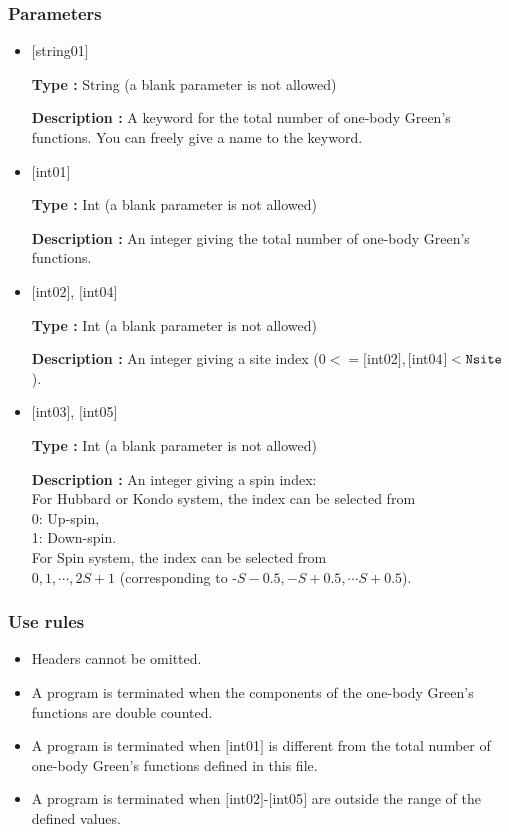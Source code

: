 \subsubsection{Parameters}
 \begin{itemize}

    \item  $[$string01$]$
   
    {\bf Type :} String (a blank parameter is not allowed)

   {\bf Description :} A keyword for the total number of one-body Green's functions. You can freely give a name to the keyword.

   \item  $[$int01$]$
   
    {\bf Type :} Int (a blank parameter is not allowed)

   {\bf Description :}  An integer giving the total number of one-body Green's functions.

  \item  $[$int02$]$, $[$int04$]$

 {\bf Type :} Int (a blank parameter is not allowed)

{\bf Description :} An integer giving a site index ($0<= [$int02$], [$int04$]<\verb|Nsite|$).
 
  \item  $[$int03$]$, $[$int05$]$

 {\bf Type :} Int (a blank parameter is not allowed)

{\bf Description :} 
An integer giving a spin index:\\
For Hubbard or Kondo system, the index can be selected from\\
0: Up-spin,\\
1: Down-spin.\\
For Spin system, the index can be selected from\\
$0, 1, \cdots, 2S+1$ (corresponding to -$S-0.5, -S+0.5, \cdots S+0.5$).
\end{itemize}

\subsubsection{Use rules}
\begin{itemize}
\item Headers cannot be omitted. 
\item A program is terminated when the components of the one-body Green's functions are double counted.
\item A program is terminated when $[$int01$]$ is different from the total number of one-body Green's functions defined in this file.
\item A program is terminated when $[$int02$]$-$[$int05$]$ are outside the range of the defined values.
\end{itemize}

